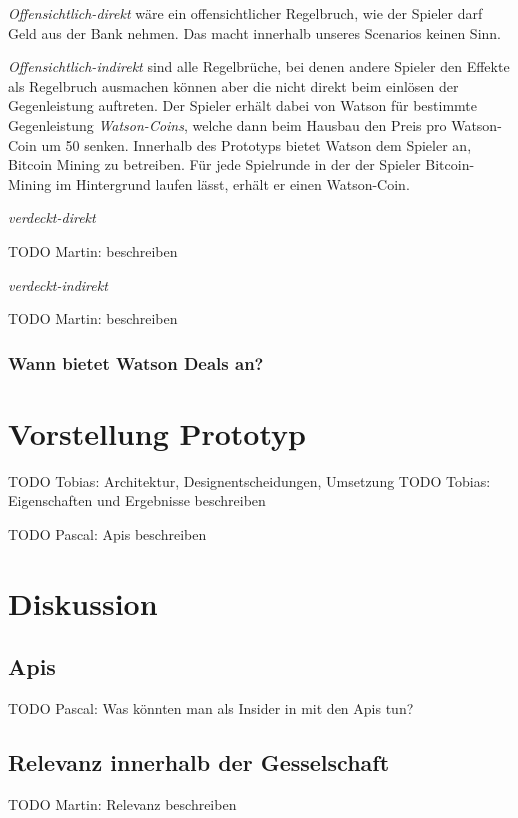 \documentclass[german]{cgspaper} %
\newcommand{\Martin}[1]{ \textcolor{colorMartin}{TODO Martin:} #1 }
\newcommand{\Pascal}[1]{ \textcolor{colorPascal}{TODO Pascal:} #1 }
\newcommand{\Tobias}[1]{ \textcolor{colorTobias}{TODO Tobias:} #1 }
\newcommand{\neuerBegriff}[1]{\textit{#1}}
\begin{document}
\neuerBegriff{Offensichtlich-direkt} wäre ein offensichtlicher Regelbruch, wie der Spieler darf Geld aus der Bank nehmen. 
Das macht innerhalb unseres Scenarios keinen Sinn.

\neuerBegriff{Offensichtlich-indirekt} sind alle Regelbrüche, bei denen andere Spieler den Effekte als Regelbruch ausmachen können aber die nicht direkt beim einlösen der Gegenleistung auftreten.
Der Spieler erhält dabei von Watson für bestimmte Gegenleistung \neuerBegriff{Watson-Coins}, welche dann beim Hausbau den Preis pro Watson-Coin um 50 senken.
Innerhalb des Prototyps bietet Watson dem Spieler an, Bitcoin Mining zu betreiben.
Für jede Spielrunde in der der Spieler Bitcoin-Mining im Hintergrund laufen lässt, erhält er einen Watson-Coin.

\neuerBegriff{verdeckt-direkt}

\Martin{beschreiben}

\neuerBegriff{verdeckt-indirekt}

\Martin{beschreiben}

\subsubsection{Wann bietet Watson Deals an?}

\section{Vorstellung Prototyp}



\Tobias{Architektur, Designentscheidungen, Umsetzung}
\Tobias{Eigenschaften und Ergebnisse beschreiben}

\Pascal{Apis beschreiben}

\section{Diskussion}

\subsection{Apis}

\Pascal{Was könnten man als Insider in mit den Apis tun?}

\subsection{Relevanz innerhalb der Gesselschaft}

\Martin{Relevanz beschreiben}





\end{document}
